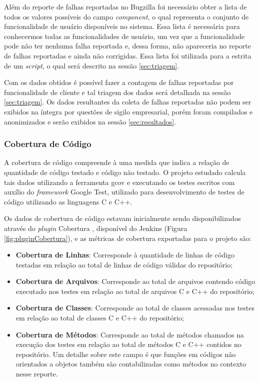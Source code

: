 \documentclass[11.5pt]{article}
\begin{document}
Além do reporte de falhas reportadas no Bugzilla foi necessário obter a lista de todos os valores
possíveis do campo \textit{component}, o qual representa o conjunto de funcionalidade de usuário
disponíveis no sistema.
Essa lista é necessária para conhecermos todas as funcionalidades de usuário, um vez que a
funcionalidade pode não ter nenhuma falha reportada e, dessa forma, não apareceria no reporte de
falhas reportadas e ainda não corrigidas.
Essa lista foi utilizada para a estrita de um \textit{script}, o qual será descrito na sessão
\ref{sec:triagem}.

Com os dados obtidos é possível fazer a contagem de falhas reportadas por funcionalidade de cliente
e tal triagem dos dados será detalhada na sessão \ref{sec:triagem}.
Os dados resultantes da coleta de falhas reportadas não podem ser exibidos na íntegra por questões
de sigilo empresarial, porém foram compilados e anonimizados e serão exibidos na sessão
\ref{sec:resultados}.

\subsubsection{Cobertura de Código} \label{sec:cobertura}

A cobertura de código compreende à uma medida que indica a relação de quantidade de código testado
e código não testado.
O projeto estudado calcula tais dados utilizando a ferramenta gcov e executando os testes escritos
com auxílio do \textit{framework} Google Test, utilizado para desenvolvimento de testes de código
utilizando as linguagens C e C++.

Os dados de cobertura de código estavam inicialmente sendo disponibilizados através do
\textit{plugin} Cobertura \cite{jenkinsCobertura}, disponível do Jenkins
(Figura \ref{fig:pluginCobertura}), e as métricas de cobertura exportadas para o projeto são:
\begin{itemize}
    \item \textbf{Cobertura de Linhas}: Corresponde à quantidade de linhas de código testadas em
          relação ao total de linhas de código válidas do repositório;

    \item \textbf{Cobertura de Arquivos}: Corresponde ao total de arquivos contendo código executado
          nos testes em relação ao total de arquivos C e C++ do repositório;

    \item \textbf{Cobertura de Classes}: Corresponde ao total de classes acessadas nos testes em
          relação ao total de classes C e C++ do repositório;

    \item \textbf{Cobertura de Métodos}: Corresponde ao total de métodos chamados na execução dos
          testes em relação ao total de métodos C e C++ contidos no repositório.
          Um detalhe sobre este campo é que funções em códigos não orientados a objetos também são
          contabilizadas como métodos no contexto nesse reporte.
\end{itemize}
\end{document}
